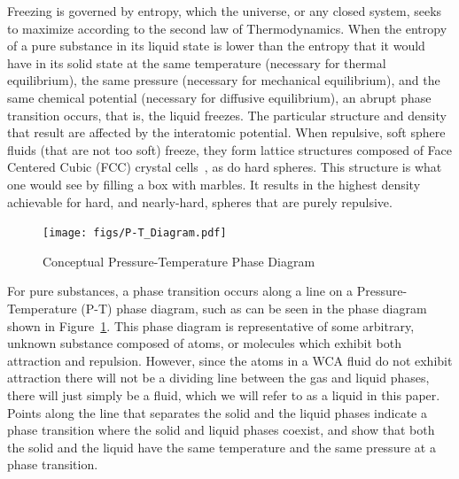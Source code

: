 \documentclass[double,12pt]{beavtex}
\begin{document}
Freezing is governed by entropy, which the universe, or any closed system, 
seeks to maximize according to the second law of Thermodynamics. When the 
entropy of a pure substance in its liquid state is lower than the entropy 
that it would have in its solid state at the same temperature (necessary 
for thermal equilibrium), the same pressure (necessary for mechanical 
equilibrium), and the same chemical potential (necessary for diffusive 
equilibrium), an abrupt phase transition occurs, that is, the liquid 
freezes. The particular structure and density that result are affected 
by the interatomic potential. When repulsive, soft sphere fluids 
(that are not too soft) freeze, they form lattice structures composed of 
Face Centered Cubic (FCC) crystal cells~\cite{Hansen}, as do hard spheres. 
This structure is what one would see by filling a box with marbles. It 
results in the highest density achievable for hard, and nearly-hard, spheres 
that are purely repulsive. 

\begin{figure}
    \centering
    \texttt{[image: figs/P-T\_Diagram.pdf]}
    \caption{Conceptual Pressure-Temperature Phase Diagram}
    \label{fig:P-T_Diagram}
\end{figure}

For pure substances, a phase transition occurs along a line on a 
Pressure-Temperature (P-T) phase diagram, such as can be seen in the phase 
diagram shown in Figure~\ref{fig:P-T_Diagram}. This phase diagram is 
representative of some arbitrary, unknown substance composed of atoms, 
or molecules which exhibit both attraction and repulsion. However, since 
the atoms in a WCA fluid do not exhibit attraction there will not be a 
dividing line between the gas and liquid phases, there will just simply
be a fluid, which we will refer to as a liquid in this paper.
Points along the line that separates the solid and the liquid phases 
indicate a phase transition where the solid and liquid phases coexist, 
and show that both the solid and the liquid have the same temperature 
and the same pressure at a phase transition.
\end{document}
